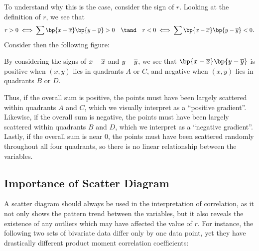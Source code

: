 To understand why this is the case, consider the sign of $r$. Looking at the definition of $r$, we see that \[r > 0 \iff \sum \bp{x - \ol{x}}\bp{y - \ol{y}} > 0 \quad \tand \quad r < 0 \iff \sum \bp{x - \ol{x}}\bp{y - \ol{y}} < 0.\] Consider then the following figure:

\begin{figure}[H]
\centering
{}
\caption{}
\end{figure}

By considering the signs of $x - \overline{x}$ and $y - \overline{y}$, we see that $\bp{x - \ol{x}}\bp{y - \ol{y}}$ is positive when $(x, y)$ lies in quadrants $A$ or $C$, and negative when $(x, y)$ lies in quadrants $B$ or $D$.

Thus, if the overall sum is positive, the points must have been largely scattered within quadrants $A$ and $C$, which we visually interpret as a ``positive gradient''. Likewise, if the overall sum is negative, the points must have been largely scattered within quadrants $B$ and $D$, which we interpret as a ``negative gradient''. Lastly, if the overall sum is near 0, the points must have been scattered randomly throughout all four quadrants, so there is no linear relationship between the variables.

\subsection{Importance of Scatter Diagram}

A scatter diagram should always be used in the interpretation of correlation, as it not only shows the pattern trend between the variables, but it also reveals the existence of any outliers which may have affected the value of $r$. For instance, the following two sets of bivariate data differ only by one data point, yet they have drastically different product moment correlation coefficients:

